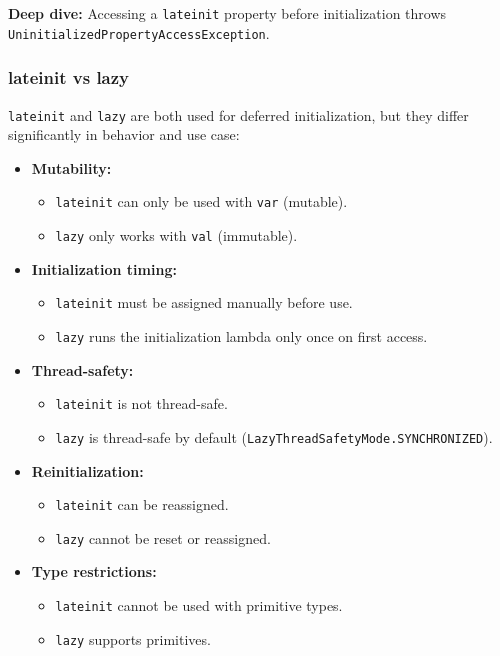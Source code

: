 \documentclass[a4paper,12pt]{article}
\begin{document}
\textbf{Deep dive:} Accessing a \texttt{lateinit} property before initialization throws \texttt{UninitializedPropertyAccessException}.

\subsubsection{lateinit vs lazy}

\texttt{lateinit} and \texttt{lazy} are both used for deferred initialization, but they differ significantly in behavior and use case:

\begin{itemize}
  \item \textbf{Mutability:}
    \begin{itemize}
      \item \texttt{lateinit} can only be used with \texttt{var} (mutable).
      \item \texttt{lazy} only works with \texttt{val} (immutable).
    \end{itemize}

  \item \textbf{Initialization timing:}
    \begin{itemize}
      \item \texttt{lateinit} must be assigned manually before use.
      \item \texttt{lazy} runs the initialization lambda only once on first access.
    \end{itemize}

  \item \textbf{Thread-safety:}
    \begin{itemize}
      \item \texttt{lateinit} is not thread-safe.
      \item \texttt{lazy} is thread-safe by default (\texttt{LazyThreadSafetyMode.SYNCHRONIZED}).
    \end{itemize}

  \item \textbf{Reinitialization:}
    \begin{itemize}
      \item \texttt{lateinit} can be reassigned.
      \item \texttt{lazy} cannot be reset or reassigned.
    \end{itemize}

  \item \textbf{Type restrictions:}
    \begin{itemize}
      \item \texttt{lateinit} cannot be used with primitive types.
      \item \texttt{lazy} supports primitives.
    \end{itemize}


\end{itemize}
\end{document}
